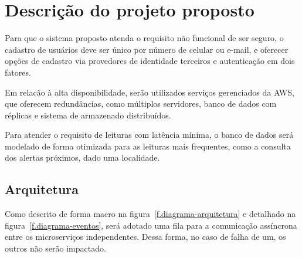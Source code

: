 \chapter{Descrição do projeto proposto}
\label{c.descricao}


Para que o sistema proposto atenda o requisito não funcional de ser seguro, o cadastro de usuários deve ser único por número de celular ou e-mail, e oferecer opções de cadastro via provedores de identidade terceiros e autenticação em dois fatores.

Em relacão à alta disponibilidade, serão utilizados serviços gerenciados da AWS, que oferecem redundâncias, como múltiplos servidores, banco de dados com réplicas e sistema de armazenado distribuídos.

Para atender o requisito de leituras com latência mínima, o banco de dados será modelado de forma otimizada para as leituras mais frequentes, como a consulta dos alertas próximos, dado uma localidade.


\section{Arquitetura}
\label{s.arquitetura}

Como descrito de forma macro na figura~\ref{f.diagrama-arquitetura} e detalhado na figura~\ref{f.diagrama-eventos}, será adotado uma fila para a comunicação assíncrona entre os microserviços independentes. Dessa forma, no caso de falha de um, os outros não serão impactado.

